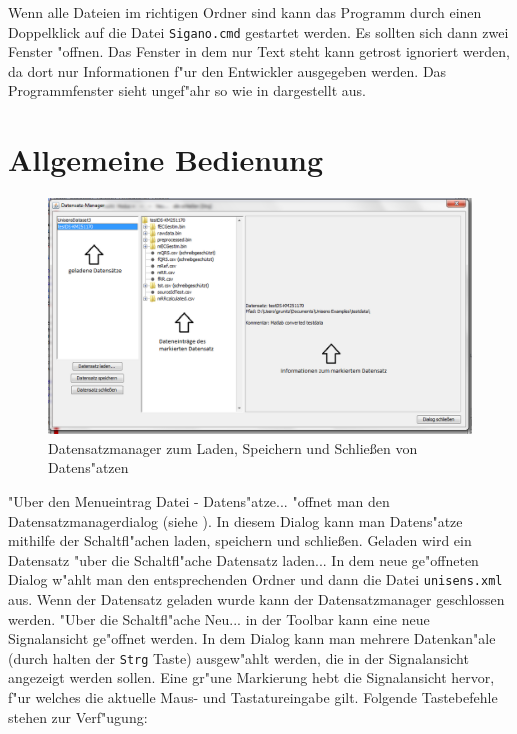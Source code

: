 Wenn alle Dateien im richtigen Ordner sind kann das Programm durch einen Doppelklick auf die Datei \verb|Sigano.cmd| gestartet werden.
Es sollten sich dann zwei Fenster "offnen.
Das Fenster in dem nur Text steht kann getrost ignoriert werden, da dort nur Informationen f"ur den Entwickler ausgegeben werden.
Das Programmfenster sieht ungef"ahr so wie in  dargestellt aus.

\section{Allgemeine Bedienung}

\begin{figure}[htb]
\centering
\includegraphics[width=\textwidth]{bilder/datensatzmanager.png}
\caption{Datensatzmanager zum Laden, Speichern und Schlie{\ss}en von Datens"atzen}
\label{pic:datensatzmanager}
\end{figure}

"Uber den Menueintrag \textsf{Datei - Datens"atze...} "offnet man den Datensatzmanagerdialog (siehe ).
In diesem Dialog kann man Datens"atze mithilfe der Schaltfl"achen laden, speichern und schlie{\ss}en.
Geladen wird ein Datensatz "uber die Schaltfl"ache \textsf{Datensatz laden...}
In dem neue ge"offneten Dialog w"ahlt man den entsprechenden Ordner und dann die Datei \verb|unisens.xml| aus.
Wenn der Datensatz geladen wurde kann der Datensatzmanager geschlossen werden.
"Uber die Schaltfl"ache \textsf{Neu...} in der Toolbar kann eine neue Signalansicht ge"offnet werden.
In dem Dialog kann man mehrere Datenkan"ale (durch halten der \verb|Strg| Taste) ausgew"ahlt werden, die in der Signalansicht angezeigt werden sollen.
Eine gr"une Markierung hebt die Signalansicht hervor, f"ur welches die aktuelle Maus- und Tastatureingabe gilt.
Folgende Tastebefehle stehen zur Verf"ugung:

